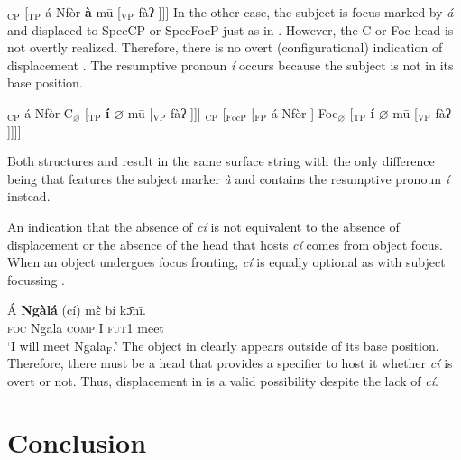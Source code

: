 \documentclass[output=paper]{langscibook}
\begin{document}
\ea {[}$_{\text{CP}}$ [$_{\text{TP}}$ á Nfòr \textbf{à} mū [$_{\text{VP}}$ fàʔ ]]]\label{ex:johanneshein:structureinsitufocus}
\z
In the other case, the subject is focus marked by \textit{á} and
displaced to SpecCP or SpecFocP just as in . However, the C or Foc
head is not overtly realized. Therefore, there is no overt
(configurational) indication of displacement . The
resumptive pronoun \textit{í} occurs because the subject is not in its base position. 

\ea \label{ex:johanneshein:structureinsitufocus2}
\begin{xlist}
\ex {[}$_{\text{CP}}$ á Nfòr C$_{\varnothing}$  [$_{\text{TP}}$ \textbf{í} $\varnothing$ mū [$_{\text{VP}}$ fàʔ ]]]
\ex {[}$_{\text{CP}}$ [$_{\text{FocP}}$ [$_{\text{FP}}$ á Nfòr ] Foc$_{\varnothing}$ [$_{\text{TP}}$ \textbf{í}
$\varnothing$ mū [$_{\text{VP}}$ fàʔ ]]]]
\end{xlist}
\z
Both structures  and  result in the same surface string
with the only difference being that  features the subject marker
\textit{à} and  contains the resumptive pronoun \textit{í}
instead. 

An indication that the absence of \textit{cí} is not equivalent to
the absence of displacement or the absence of the head that hosts
\textit{cí} comes from object focus. When an object undergoes focus
fronting, \textit{cí} is equally optional as with subject
focussing .

\ea \label{ex:johanneshein:objectfocus}
\gll Á \textbf{Ngàlá} (cí) mὲ bí kɔ̄nī.\\
\textsc{foc} Ngala \textsc{comp} I \textsc{fut1} meet\\
\glt `I will meet Ngala$_{\text{F}}$.'\hfill\citep[][60]{becker+nformi16}
\z
The object in  clearly appears outside of its base position.
Therefore, there must be a head that provides a specifier to host it
whether \textit{cí} is overt or not. Thus, displacement in  is
a valid possibility despite the lack of \textit{cí}.

\section{Conclusion}
\label{sec:johanneshein:conclusion}
\end{document}
